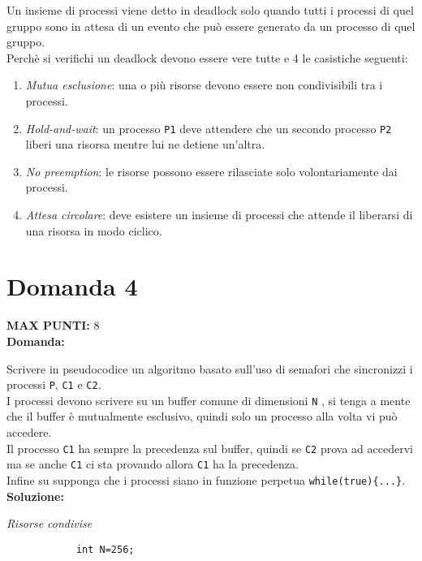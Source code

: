 \documentclass{article}
\begin{document}
    Un insieme di processi viene detto in deadlock solo quando tutti i processi di quel gruppo sono in attesa di un evento che può essere generato da un processo di quel gruppo.\\
    Perchè si verifichi un deadlock devono essere vere tutte e 4 le casistiche seguenti:
    \begin{enumerate}
        \item \emph{Mutua esclusione}: una o più risorse devono essere non condivisibili tra i processi.
        \item \emph{Hold-and-wait}: un processo \verb+P1+ deve attendere che un secondo processo \verb+P2+ liberi una risorsa mentre lui ne detiene un'altra.
        \item \emph{No preemption}: le risorse possono essere rilasciate solo volontariamente dai processi.
        \item \emph{Attesa circolare}: deve esistere un insieme di processi che attende il liberarsi di una risorsa in modo ciclico.
    \end{enumerate}
    \section*{Domanda 4}
    \textbf{MAX PUNTI:} 8\\
    \textbf{Domanda:}


    Scrivere in pseudocodice un algoritmo basato sull'uso di semafori che sincronizzi i processi \verb+P+, \verb+C1+ e \verb+C2+.\\
    I processi devono scrivere su un buffer comune di dimensioni \verb+N+ , si tenga a mente che il buffer è mutualmente esclusivo, quindi solo un processo alla volta vi può accedere.\\
    Il processo \verb+C1+ ha sempre la precedenza sul buffer, quindi se \verb+C2+ prova ad accedervi ma se anche \verb+C1+ ci sta provando allora \verb+C1+ ha la precedenza.\\
    Infine su supponga che i processi siano in funzione perpetua \verb+while(true){...}+.\\
    \textbf{Soluzione:}
    \begin{center}
        \emph{Risorse condivise}\\
        \begin{lstlisting}
            int N=256;
            
        \end{lstlisting}
    \end{center}
\end{document}
